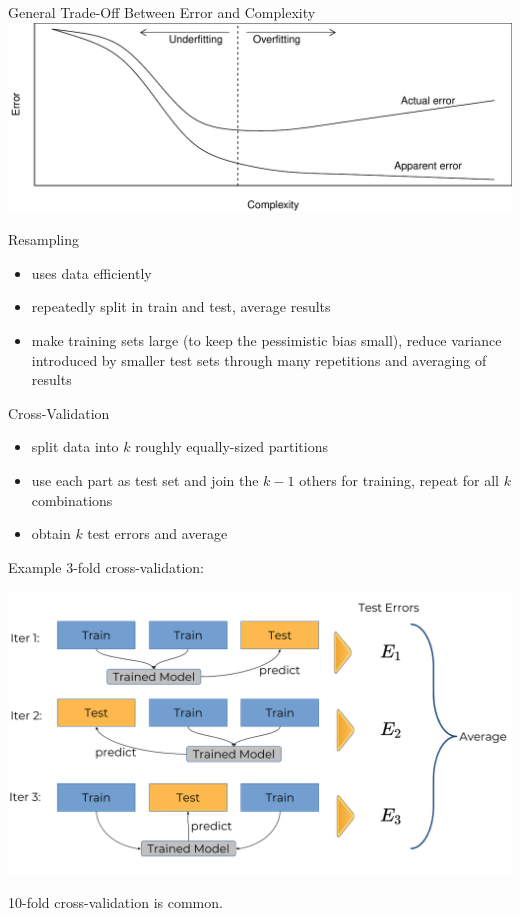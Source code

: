     \begin{frame}[c]{General Trade-Off Between Error and Complexity}
    \includegraphics[width=\textwidth]{overfitting}
    \end{frame}

    \begin{frame}[c]{Resampling}
        \begin{itemize}
            \item uses data efficiently
            \item repeatedly split in train and test, average results
            \item make training sets large (to keep the pessimistic bias small),
                reduce variance introduced by smaller test sets through many
                repetitions and averaging of results
        \end{itemize}
    \end{frame}

    \begin{frame}[c]{Cross-Validation}

    \begin{itemize}
      \item split data into $k$ roughly equally-sized partitions
      \item use each part as test set and join the $k-1$ others for training,
          repeat for all $k$ combinations
      \item obtain $k$ test errors and average
    \end{itemize}

    Example 3-fold cross-validation:

    \begin{center}
    \includegraphics[height=.5\textheight]{crossvalidation.png}
    \end{center}
    10-fold cross-validation is common.
    \end{frame}

